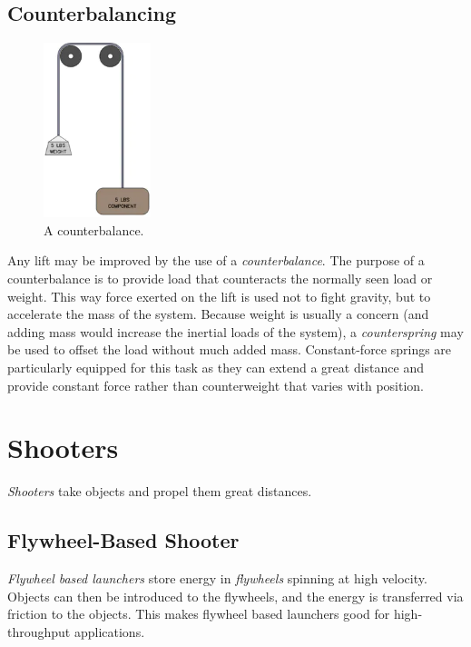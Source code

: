 \subsection{Counterbalancing}
\begin{figure}[H]
	\includegraphics[height=2in]{imgs/counterbalance.png}
	\caption{A counterbalance.}
\end{figure}

Any lift may be improved by the use of a \textit{counterbalance}. The purpose of a counterbalance is to provide load that counteracts the normally seen load or weight. This way force exerted on the lift is used not to fight gravity, but to accelerate the mass of the system. Because weight is usually a concern (and adding mass would increase the inertial loads of the system), a \textit{counterspring} may be used to offset the load without much added mass. Constant-force springs are particularly equipped for this task as they can extend a great distance and provide constant force rather than counterweight that varies with position.

\section{Shooters}
\textit{Shooters} take objects and propel them great distances.
\subsection{Flywheel-Based Shooter}
\textit{Flywheel based launchers} store energy in \textit{flywheels} spinning at high velocity. Objects can then be introduced to the flywheels, and the energy is transferred via friction to the objects. This makes flywheel based launchers good for high-throughput applications.

